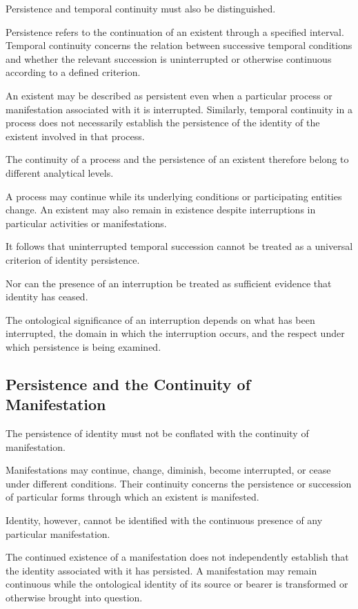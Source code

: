Persistence and temporal continuity must also be
distinguished.

Persistence refers to the continuation of an existent
through a specified interval. Temporal continuity concerns
the relation between successive temporal conditions
and whether the relevant succession is uninterrupted
or otherwise continuous according to a defined criterion.

An existent may be described as persistent even when
a particular process or manifestation associated with
it is interrupted. Similarly, temporal continuity in
a process does not necessarily establish the persistence
of the identity of the existent involved in that process.

The continuity of a process and the persistence of
an existent therefore belong to different analytical
levels.

A process may continue while its underlying conditions
or participating entities change. An existent may also
remain in existence despite interruptions in particular
activities or manifestations.

It follows that uninterrupted temporal succession
cannot be treated as a universal criterion of identity
persistence.

Nor can the presence of an interruption be treated
as sufficient evidence that identity has ceased.

The ontological significance of an interruption depends
on what has been interrupted, the domain in which the
interruption occurs, and the respect under which
persistence is being examined.

\subsection{Persistence and the Continuity of Manifestation}

The persistence of identity must not be conflated with
the continuity of manifestation.

Manifestations may continue, change, diminish, become
interrupted, or cease under different conditions.
Their continuity concerns the persistence or succession
of particular forms through which an existent is manifested.

Identity, however, cannot be identified with the
continuous presence of any particular manifestation.

The continued existence of a manifestation does not
independently establish that the identity associated
with it has persisted. A manifestation may remain
continuous while the ontological identity of its source
or bearer is transformed or otherwise brought into question.

